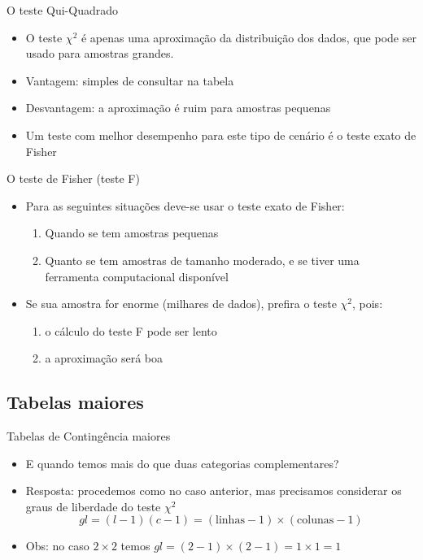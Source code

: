\documentclass{beamer}
\begin{document}
\begin{frame}{O teste Qui-Quadrado}
  \begin{itemize}
  \item O teste $\chi^2$ é apenas uma aproximação da distribuição dos
    dados, que pode ser usado para amostras grandes.
  \item Vantagem: simples de consultar na tabela
  \item Desvantagem: a aproximação é ruim para amostras pequenas
  \item Um teste com melhor desempenho para este tipo de cenário é o
    \alert{teste exato de Fisher}
  \end{itemize}
\end{frame}

\begin{frame}{O teste de Fisher (teste F)}
  \begin{itemize}
  \item Para as seguintes situações deve-se usar o teste exato de
    Fisher:
    \begin{enumerate}
    \item Quando se tem amostras pequenas
    \item Quanto se tem amostras de tamanho moderado, e se tiver uma
      ferramenta computacional disponível
    \end{enumerate}
  \item Se sua amostra for enorme (milhares de dados), prefira o teste
    $\chi^2$, pois:
    \begin{enumerate}
    \item o cálculo do teste F pode ser lento
    \item a aproximação será boa
    \end{enumerate}
  \end{itemize}
\end{frame}

\subsection{Tabelas maiores}

\begin{frame}{Tabelas de Contingência maiores}
  \begin{itemize}
  \item E quando temos mais do que duas categorias complementares?
  \item Resposta: procedemos como no caso anterior, mas precisamos
    considerar os \alert{graus de liberdade} do teste $\chi^2$
    \begin{displaymath}
        gl = (l-1)(c-1) = (\text{linhas} -1)\times (\text{colunas}-1)
    \end{displaymath}
  \item Obs: no caso $2 \times 2$ temos $gl = (2-1) \times (2-1)=1
    \times 1 = 1$
  \end{itemize}
\end{frame}
\end{document}
